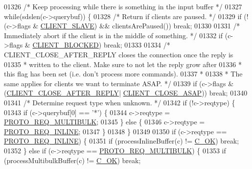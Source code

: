 \begin{DoxyCode}
{{{{{{{{{{{{{{{01326     \textcolor{comment}{/* Keep processing while there is something in the input buffer */}
01327     \textcolor{keywordflow}{while}(sdslen(c->querybuf)) \{
01328         \textcolor{comment}{/* Return if clients are paused. */}
01329         \textcolor{keywordflow}{if} (!(c->flags & \hyperlink{server_8h_ae9f6995948253652bc9454d79a72f4a7}{CLIENT\_SLAVE}) && clientsArePaused()) \textcolor{keywordflow}{break};
01330 
01331         \textcolor{comment}{/* Immediately abort if the client is in the middle of something. */}
01332         \textcolor{keywordflow}{if} (c->flags & \hyperlink{server_8h_a503ad979164a52f0f5e2a63e4c7da3a0}{CLIENT\_BLOCKED}) \textcolor{keywordflow}{break};
01333 
01334         \textcolor{comment}{/* CLIENT\_CLOSE\_AFTER\_REPLY closes the connection once the reply is}
01335 \textcolor{comment}{         * written to the client. Make sure to not let the reply grow after}
01336 \textcolor{comment}{         * this flag has been set (i.e. don't process more commands).}
01337 \textcolor{comment}{         *}
01338 \textcolor{comment}{         * The same applies for clients we want to terminate ASAP. */}
01339         \textcolor{keywordflow}{if} (c->flags & (\hyperlink{server_8h_a8cff2154afcc2e87ac85bdbbe2814091}{CLIENT\_CLOSE\_AFTER\_REPLY}|
      \hyperlink{server_8h_ad6690c6231b67525b8b2057e092a8361}{CLIENT\_CLOSE\_ASAP})) \textcolor{keywordflow}{break};
01340 
01341         \textcolor{comment}{/* Determine request type when unknown. */}
01342         \textcolor{keywordflow}{if} (!c->reqtype) \{
01343             \textcolor{keywordflow}{if} (c->querybuf[0] == \textcolor{stringliteral}{'*'}) \{
01344                 c->reqtype = \hyperlink{server_8h_a50727b40ccd59633a681f9d09a9b9d72}{PROTO\_REQ\_MULTIBULK};
01345             \} \textcolor{keywordflow}{else} \{
01346                 c->reqtype = \hyperlink{server_8h_ad4314f4e8ae551ef0fd4e75c63eb5bc6}{PROTO\_REQ\_INLINE};
01347             \}
01348         \}
01349 
01350         \textcolor{keywordflow}{if} (c->reqtype == \hyperlink{server_8h_ad4314f4e8ae551ef0fd4e75c63eb5bc6}{PROTO\_REQ\_INLINE}) \{
01351             \textcolor{keywordflow}{if} (processInlineBuffer(c) != \hyperlink{server_8h_a303769ef1065076e68731584e758d3e1}{C\_OK}) \textcolor{keywordflow}{break};
01352         \} \textcolor{keywordflow}{else} \textcolor{keywordflow}{if} (c->reqtype == \hyperlink{server_8h_a50727b40ccd59633a681f9d09a9b9d72}{PROTO\_REQ\_MULTIBULK}) \{
01353             \textcolor{keywordflow}{if} (processMultibulkBuffer(c) != \hyperlink{server_8h_a303769ef1065076e68731584e758d3e1}{C\_OK}) \textcolor{keywordflow}{break};
}}}}}}}}}}}}}}}
\end{DoxyCode}
